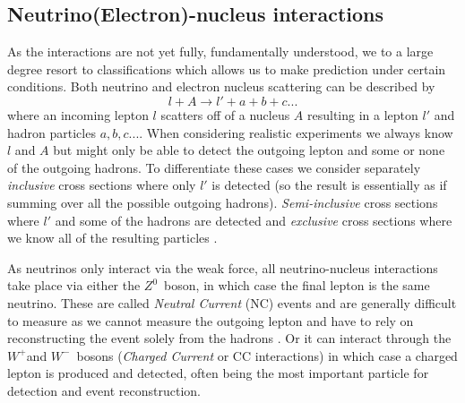 \documentclass[a4paper,12pt]{article}
\newcommand{\Zz}{$Z^0$}
\newcommand{\Wp}{$W^+$}
\newcommand{\Wm}{$W^-$}
\begin{document}


\subsection{Neutrino(Electron)-nucleus interactions}
As the interactions are not yet fully, fundamentally understood, we to a large degree resort to classifications which allows us to make prediction under certain conditions.
Both neutrino and electron nucleus scattering can be described by
\begin{equation}
    l + A \rightarrow l' + a + b + c ...
\end{equation}
where an incoming lepton $l$ scatters off of a nucleus $A$ resulting in a lepton $l'$ and hadron particles $a, b, c ...$.
When considering realistic experiments we always know $l$ and $A$ but might only be able to detect the outgoing lepton and some or none of the outgoing hadrons. 
To differentiate these cases we consider separately \emph{inclusive} cross sections where only $l'$ is detected (so the result is essentially as if summing over all the possible outgoing hadrons).
\emph{Semi-inclusive} cross sections where $l'$ and some of the hadrons are detected and \emph{exclusive} cross sections where we know all of the resulting particles \cite{amaroElectronNeutrinonucleusScattering2020}.

As neutrinos only interact via the weak force, all neutrino-nucleus interactions take place via either the \Zz\ boson, in which case the final lepton is the same neutrino.
These are called \emph{Neutral Current} (NC) events and are generally difficult to measure as we cannot measure the outgoing lepton and have to rely on reconstructing the event solely from the hadrons \cite{giustiNeutralCurrentNeutrinonucleus2020}.
Or it can interact through the \Wp and \Wm\ bosons (\emph{Charged Current} or CC interactions) in which case a charged lepton is produced and detected, often being the most important particle for detection and event reconstruction.
\end{document}
